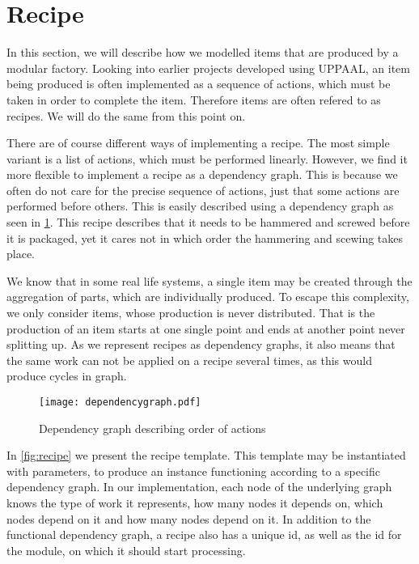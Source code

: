 \section{Recipe}\label{sec:recipe}
In this section, we will describe how we modelled items that are produced by a modular factory. Looking into earlier projects developed using UPPAAL, an item being produced is often implemented as a sequence of actions, which must be taken in order to complete the item. Therefore items are often refered to as recipes. We will do the same from this point on. 

There are of course different ways of implementing a recipe. The most simple variant is a list of actions, which must be performed linearly. However, we find it more flexible to implement a recipe as a dependency graph. This is because we often do not care for the precise sequence of actions, just that some actions are performed before others. This is easily described using a dependency graph as seen in \cref{fig:dependency-graph}. This recipe describes that it needs to be hammered and screwed before it is packaged, yet it cares not in which order the hammering and scewing takes place. 

We know that in some real life systems, a single item may be created through the aggregation of parts, which are individually produced. To escape this complexity, we only consider items, whose production is never distributed. That is the production of an item starts at one single point and ends at another point never splitting up. As we represent recipes as dependency graphs, it also means that the same work can not be applied on a recipe several times, as this would produce cycles in graph. 

\begin{figure}[h]
\centering
\texttt{[image: dependencygraph.pdf]}
\caption{Dependency graph describing order of actions}
\label{fig:dependency-graph}
\end{figure}

In \cref{fig:recipe} we present the recipe template. This template may be instantiated with parameters, to produce an instance functioning according to a specific dependency graph. In our implementation, each node of the underlying graph knows the type of work it represents, how many nodes it depends on, which nodes depend on it and how many nodes depend on it. In addition to the functional dependency graph, a recipe also has a unique id, as well as the id for the module, on which it should start processing. 

